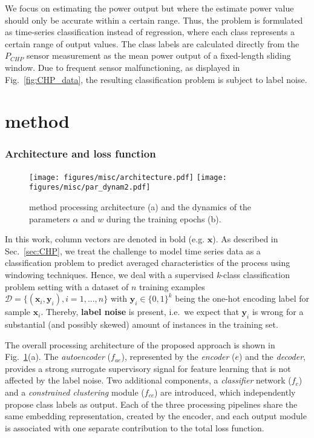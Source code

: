 \documentclass[runningheads, envcountsame, a4paper]{llncs}
\begin{document}
We focus on estimating the power output but where the estimate power value should only be accurate within a certain range. 
Thus,  the problem is formulated as time-series classification instead of regression, where each class represents a certain range of output values.
The class labels are calculated directly from the $P_{CHP}$ sensor measurement as the mean power output of a fixed-length sliding window.
Due to frequent sensor malfunctioning, as displayed in Fig.~\ref{fig:CHP_data}, the resulting classification problem is subject to label noise.


\section{\acrfull{method}}\label{sec:method}
\subsubsection{Architecture and loss function} 
\begin{figure}[tb]
    \centering
    \texttt{[image: figures/misc/architecture.pdf]}\:\:
    \texttt{[image: figures/misc/par\_dynam2.pdf]}
    \caption{\acrshort{method} processing architecture (a) and the dynamics of the parameters $\alpha$ and $w$ during the training epochs (b). }
    \label{fig:CNN}
\end{figure}

In this work, column vectors are denoted in bold (e.g. $\bm{x}$). As described in Sec.~\ref{sec:CHP}, we treat the challenge to model time series data as
a classification problem to predict  averaged characteristics of the process using windowing techniques.
Hence, we deal with a supervised \textit{k}-class classification problem setting with a dataset of $n$ training examples $\mathcal{D}= \{ (\bm{x}_i, \bm{y}_i), i=1,...,n\}$ with $\bm{y}_i \in \{ 0, 1 \} ^k $  being the one-hot encoding label for sample $\bm{x}_i$. Thereby, {\bf label noise} is present, i.e.\ we expect that $\bm{y}_i$ is wrong for a substantial (and possibly skewed) amount of instances in the training set.

The overall processing architecture of the proposed approach is shown in Fig.~\ref{fig:CNN}(a).
The \textit{autoencoder} ($f_{ae}$), represented by the \textit{encoder} ($e$) and the \textit{decoder}, provides a strong surrogate supervisory signal for feature learning \cite{jawed2020self} that is not affected by the label noise. 
Two additional components, a \textit{classifier} network ($f_c$) and a \textit{constrained clustering} module ($f_{cc}$) are introduced, which independently propose class labels as output. 
Each of the three processing pipelines share the same embedding representation, created by the encoder,  and each output module is associated with one separate contribution to the total loss function.
\end{document}
